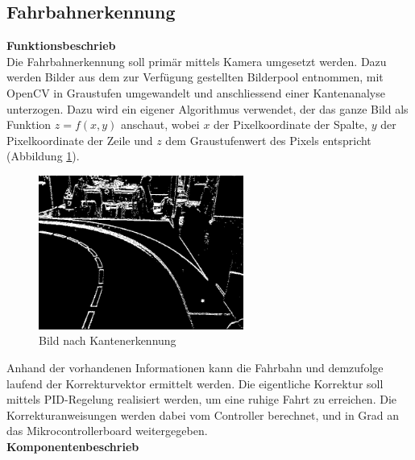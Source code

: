 \subsection{Fahrbahnerkennung}
\textbf{Funktionsbeschrieb}\\[0.2cm]
Die Fahrbahnerkennung soll primär mittels Kamera umgesetzt werden. Dazu werden Bilder aus dem zur Verfügung gestellten Bilderpool entnommen, mit OpenCV in Graustufen umgewandelt und anschliessend einer Kantenanalyse unterzogen. Dazu wird ein eigener Algorithmus verwendet, der das ganze Bild als Funktion $z = f(x,y)$ anschaut, wobei $x$ der Pixelkoordinate der Spalte, $y$ der Pixelkoordinate der Zeile und $z$ dem Graustufenwert des Pixels entspricht (Abbildung \ref{fig:edges}).
\begin{figure}[H]%
\centering
\includegraphics[width=0.6\textwidth]{03_Loesungskonzept/pictures/Kantengrafik.png}
\caption{Bild nach Kantenerkennung}
\label{fig:edges}
\end{figure}
Anhand der vorhandenen Informationen kann die Fahrbahn und demzufolge laufend der Korrekturvektor ermittelt werden. Die eigentliche Korrektur soll mittels PID-Regelung realisiert werden, um eine ruhige Fahrt zu erreichen. Die Korrekturanweisungen werden dabei vom Controller berechnet, und in Grad an das Mikrocontrollerboard weitergegeben.\\[0.2cm]
\newpage
\textbf{Komponentenbeschrieb}
